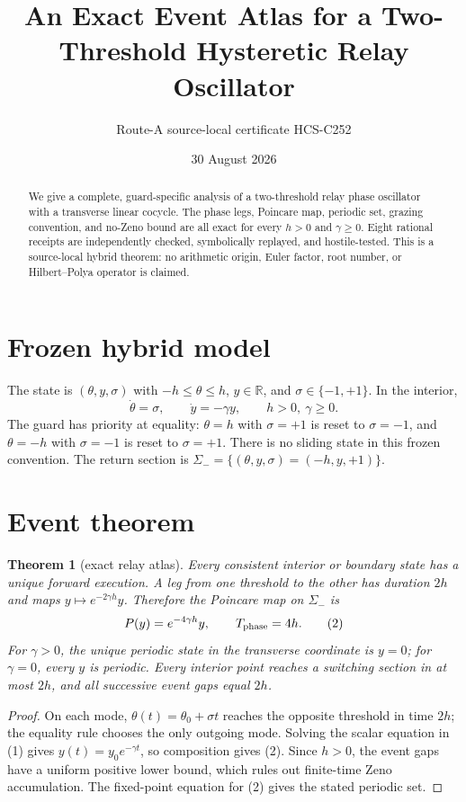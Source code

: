 \documentclass[10pt]{article}
\title{An Exact Event Atlas for a Two-Threshold Hysteretic Relay Oscillator}
\author{Route-A source-local certificate HCS-C252}
\date{30 August 2026}
\newtheorem{theorem}{Theorem}
\begin{document}
\maketitle
\begin{abstract}
We give a complete, guard-specific analysis of a two-threshold relay phase
oscillator with a transverse linear cocycle.  The phase legs, Poincare map,
periodic set, grazing convention, and no-Zeno bound are all exact for every
$h>0$ and $\gamma\geq0$.  Eight rational receipts are independently checked,
symbolically replayed, and hostile-tested.  This is a source-local hybrid
theorem: no arithmetic origin, Euler factor, root number, or Hilbert--Polya
operator is claimed.
\end{abstract}

\section{Frozen hybrid model}
The state is $(\theta,y,\sigma)$ with $-h\leq\theta\leq h$,
$y\in\mathbb R$, and $\sigma\in\{-1,+1\}$.  In the interior,
\[
 \dot\theta=\sigma,\qquad \dot y=-\gamma y,\qquad h>0,\ \gamma\geq0.
 \tag{1}
\]
The guard has priority at equality: $\theta=h$ with $\sigma=+1$ is reset to
$\sigma=-1$, and $\theta=-h$ with $\sigma=-1$ is reset to $\sigma=+1$.
There is no sliding state in this frozen convention.  The return section is
$\Sigma_-=\{(\theta,y,\sigma)=(-h,y,+1)\}$.

\section{Event theorem}
\begin{theorem}[exact relay atlas]
Every consistent interior or boundary state has a unique forward execution.
A leg from one threshold to the other has duration $2h$ and maps
$y\mapsto e^{-2\gamma h}y$.  Therefore the Poincare map on $\Sigma_-$ is
\[
 P(y)=e^{-4\gamma h}y, \qquad T_{\rm phase}=4h. \tag{2}
\]
For $\gamma>0$, the unique periodic state in the transverse coordinate is
$y=0$; for $\gamma=0$, every $y$ is periodic.  Every interior point reaches a
switching section in at most $2h$, and all successive event gaps equal $2h$.
\end{theorem}
\begin{proof}
On each mode, $\theta(t)=\theta_0+\sigma t$ reaches the opposite threshold in
time $2h$; the equality rule chooses the only outgoing mode.  Solving the
scalar equation in (1) gives $y(t)=y_0e^{-\gamma t}$, so composition gives
(2).  Since $h>0$, the event gaps have a uniform positive lower bound, which
rules out finite-time Zeno accumulation.  The fixed-point equation for (2)
gives the stated periodic set.
\end{proof}
\end{document}
